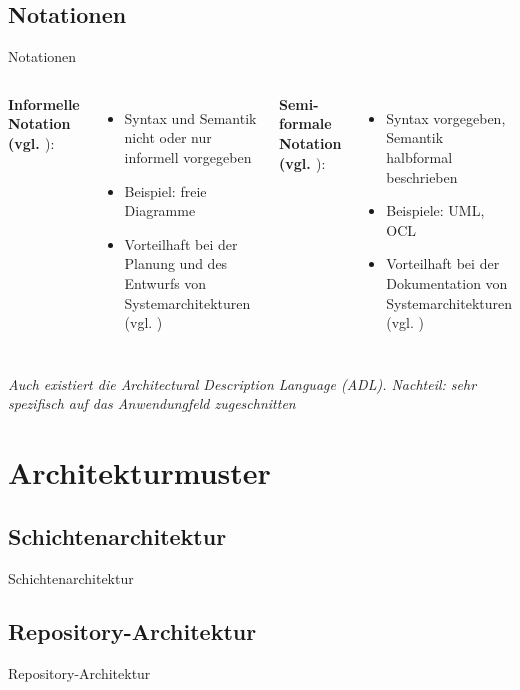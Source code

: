 \documentclass{beamer}
\begin{document}
			\subsection{Notationen}
			\begin{frame}{Notationen}
			\begin{columns}
			\textbf{Informelle Notation (vgl. \cite[ S. 8]{req}}):
				\begin{itemize}
					\item Syntax und Semantik nicht oder nur informell vorgegeben
					\item Beispiel: freie Diagramme
					\item Vorteilhaft bei der Planung und des Entwurfs von Systemarchitekturen (vgl. \cite[ S. 191]{sommer})
				\end{itemize}				
				\textbf{Semi-formale Notation (vgl. \cite[ S. 8]{req}}):
				\begin{itemize}
					\item Syntax vorgegeben, Semantik halbformal beschrieben
					\item Beispiele: UML, OCL
					\item Vorteilhaft bei der Dokumentation von Systemarchitekturen (vgl. \cite[ S. 191]{sommer})
				\end{itemize}
			\end{columns}
			\textit{Auch existiert die Architectural Description Language (ADL). Nachteil: sehr spezifisch auf das Anwendungfeld zugeschnitten}
			\end{frame}
		
		\section{Architekturmuster}
			\subsection{Schichtenarchitektur}
			\begin{frame}{Schichtenarchitektur}
			
			\end{frame}
			\subsection{Repository-Architektur}
			\begin{frame}{Repository-Architektur}
			
			\end{frame}	
\end{document}
